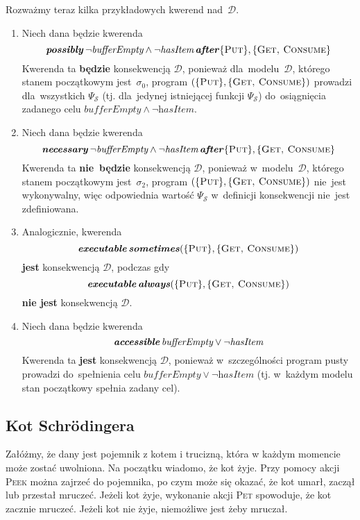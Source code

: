 \documentclass[11pt,a4paper]{article}
\DeclareMathOperator{\After}{\textbf{\textit{after}}}
\DeclareMathOperator{\Always}{\textbf{\textit{always}}}
\DeclareMathOperator{\Sometimes}{\textbf{\textit{sometimes}}}
\DeclareMathOperator{\Executable}{\textbf{\textit{executable}}}
\DeclareMathOperator{\Accessible}{\textbf{\textit{accessible}}}
\DeclareMathOperator{\Possibly}{\textbf{\textit{possibly}}}
\DeclareMathOperator{\Necessary}{\textbf{\textit{necessary}}}
\begin{document}
Rozważmy teraz kilka przykładowych kwerend nad~$\mathcal{D}$.

\begin{enumerate}
    \item Niech dana będzie kwerenda
    $$ \Possibly \neg \textit{bufferEmpty} \land \neg \textit{hasItem} \After \{ \textsc{Put} \}, \{ \textsc{Get, Consume} \} $$
    Kwerenda ta \textbf{będzie} konsekwencją $\mathcal{D}$, ponieważ dla~modelu~$\mathcal{D}$, którego stanem początkowym jest~$\sigma_0$, program $(\{ \textsc{Put} \}, \{ \textsc{Get, Consume} \})$ prowadzi dla~wszystkich $\Psi_\mathcal{S}$ (tj. dla~jedynej istniejącej funkcji $\Psi_\mathcal{S}$) do~osiągnięcia zadanego celu $\textit{bufferEmpty} \land \neg \textit{hasItem}$.

    \item Niech dana będzie kwerenda
    $$ \Necessary \neg \textit{bufferEmpty} \land \neg \textit{hasItem} \After \{ \textsc{Put} \}, \{ \textsc{Get, Consume} \} $$
    Kwerenda ta \textbf{nie~będzie} konsekwencją $\mathcal{D}$, ponieważ w~modelu~$\mathcal{D}$, którego stanem początkowym jest~$\sigma_2$, program $(\{ \textsc{Put} \}, \{ \textsc{Get, Consume} \})$ nie~jest wykonywalny, więc odpowiednia wartość $\Psi_\mathcal{S}$ w~definicji konsekwencji nie~jest zdefiniowana.

    \item Analogicznie, kwerenda
    $$\Executable \Sometimes (\{ \textsc{Put} \}, \{ \textsc{Get, Consume} \})$$
    \textbf{jest} konsekwencją $\mathcal{D}$, podczas gdy
    $$\Executable \Always (\{ \textsc{Put} \}, \{ \textsc{Get, Consume} \})$$
    \textbf{nie jest} konsekwencją $\mathcal{D}$.

    \item Niech dana będzie kwerenda
    $$ \Accessible \textit{bufferEmpty} \lor \neg \textit{hasItem} $$
    Kwerenda ta \textbf{jest} konsekwencją $\mathcal{D}$, ponieważ w~szczególności program pusty prowadzi do~spełnienia celu $\textit{bufferEmpty} \lor \neg \textit{hasItem}$ (tj. w~każdym modelu stan początkowy spełnia zadany cel).
\end{enumerate}

\subsection{Kot Schrödingera}
Załóżmy, że dany jest pojemnik z kotem i trucizną, która w każdym momencie może zostać uwolniona. Na początku wiadomo, że kot żyje. Przy pomocy akcji \textsc{Peek} można zajrzeć do pojemnika, po czym może się okazać, że kot umarł, zaczął lub przestał mruczeć. Jeżeli kot żyje, wykonanie akcji \textsc{Pet} spowoduje, że kot zacznie mruczeć. Jeżeli kot nie żyje, niemożliwe jest żeby mruczał.
\end{document}
